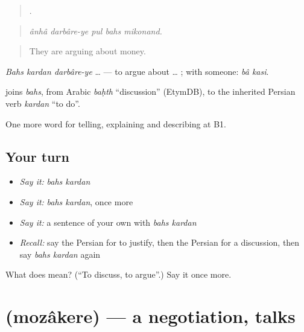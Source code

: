 \begin{quote}
    .
\end{quote}

\begin{quote}
\emph{ânhâ darbâre-ye pul bahs mikonand.}
\end{quote}

\begin{quote}
They are arguing about money.
\end{quote}

\emph{Bahs kardan darbâre-ye} … — to argue about … ; with someone: \emph{bâ kasi}.

\begin{cousinweb}
\textbf{ } joins \emph{bahs}, from Arabic \emph{baḥth} \textquotedblleft{}discussion\textquotedblright{} (EtymDB), to the inherited Persian verb \emph{kardan} \textquotedblleft{}to do\textquotedblright{}.
\end{cousinweb}

\begin{grammarlens}[title={What you've built}]
One more word for telling, explaining and describing at B1.
\end{grammarlens}

\subsection*{Your turn}
\begin{itemize}
\raggedright
  \item \emph{Say it:} \emph{bahs kardan}
  \item \emph{Say it:} \emph{bahs kardan}, once more
  \item \emph{Say it:} a sentence of your own with \emph{bahs kardan}
  \item \emph{Recall:} say the Persian for to justify, then the Persian for a discussion, then say \emph{bahs kardan} again
\end{itemize}

\begin{tcolorbox}[breakable,colback=teal!4,colframe=teal!35!black,title={Before you move on}]
What does   mean? (\textquotedblleft{}To discuss, to argue\textquotedblright{}.) Say it once more.
\end{tcolorbox}
\section[\texorpdfstring{\fa{مذاکره} (mozâkere)}{مذاکره (mozâkere)}]{ (mozâkere) — a negotiation, talks}

